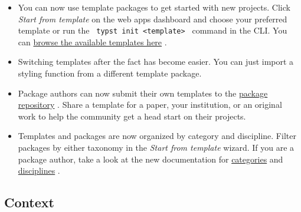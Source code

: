 \begin{itemize}
\tightlist
\item
  You can now use template packages to get started with new projects.
  Click \emph{Start from template} on the web app\textquotesingle s
  dashboard and choose your preferred template or run the
  \texttt{\ typst\ init\ \textless{}template\textgreater{}\ } command in
  the CLI. You can
  \href{https://typst.app/universe/search/?kind=templates}{browse the
  available templates here} .
\item
  Switching templates after the fact has become easier. You can just
  import a styling function from a different template package.
\item
  Package authors can now submit their own templates to the
  \href{https://github.com/typst/packages}{package repository} . Share a
  template for a paper, your institution, or an original work to help
  the community get a head start on their projects.
\item
  Templates and packages are now organized by category and discipline.
  Filter packages by either taxonomy in the \emph{Start from template}
  wizard. If you are a package author, take a look at the new
  documentation for
  \href{https://github.com/typst/packages/blob/main/CATEGORIES.md}{categories}
  and
  \href{https://github.com/typst/packages/blob/main/DISCIPLINES.md}{disciplines}
  .
\end{itemize}

\subsection{Context}\label{context}

